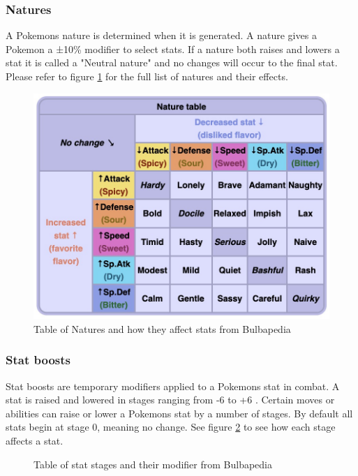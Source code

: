 \subsubsection{Natures}
A Pokemons nature \cite{Natures} is determined when it is generated. A nature gives a Pokemon a ±10\% modifier to select stats.
If a nature both raises and lowers a stat it is called a "Neutral nature" and no changes will occur to the final stat.
Please refer to figure \ref{tab:nature-table} for the full list of natures and their effects.
\begin{figure}[H]
  \centering
  \includegraphics[width=.8\textwidth]{assets/nature-stat-table.jpg}
  \caption{Table of Natures and how they affect stats from Bulbapedia \cite{Natures}}
  \label{tab:nature-table}
\end{figure}

\subsubsection{Stat boosts}
Stat boosts are temporary modifiers applied to a Pokemons stat in combat. A stat is raised and lowered in stages ranging from -6 to +6 \cite{StatBoosts}.
Certain moves or abilities can raise or lower a Pokemons stat by a number of stages. By default all stats begin at stage 0, meaning no change. 
See figure \ref{tab:stat-stage-modifiers} to see how each stage affects a stat.

\begin{figure}[H]
  \centering
  \caption{Table of stat stages and their modifier from Bulbapedia \cite{StatBoosts}}
  \label{tab:stat-stage-modifiers}

\end{figure}


